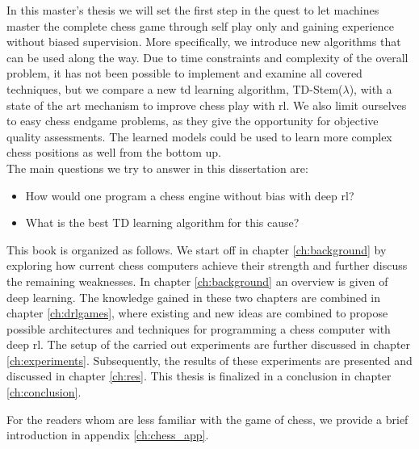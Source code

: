 In this master's thesis we will set the first step in the quest to let machines master the complete chess game through self play only and gaining experience without biased supervision. More specifically, we introduce new algorithms that can be used along the way. Due to time constraints and complexity of the overall problem, it has not been possible to implement and examine all covered techniques, but we compare a new \gls{td} learning algorithm, TD-Stem($\lambda$), with a state of the art mechanism to improve chess play with \gls{rl}. We also limit ourselves to easy chess endgame problems, as they give the opportunity for objective quality assessments. The learned models could be used to learn more complex chess positions as well from the bottom up.\\
The main questions we try to answer in this dissertation are:
\begin{itemize}
\item How would one program a chess engine without bias with deep \gls{rl}?
\item What is the best TD learning algorithm for this cause?
\end{itemize}

This book is organized as follows. We start off in chapter \ref{ch:background} by exploring how current chess computers achieve their strength and further discuss the remaining weaknesses. In chapter \ref{ch:background} an overview is given of deep learning. The knowledge gained in these two chapters are combined in chapter \ref{ch:drlgames}, where existing and new ideas are combined to propose possible architectures and techniques for programming a chess computer with deep \gls{rl}. The setup of the carried out experiments are further discussed in chapter \ref{ch:experiments}. Subsequently, the results of these experiments are presented and discussed in chapter \ref{ch:res}. This thesis is finalized in a conclusion in chapter \ref{ch:conclusion}.

For the readers whom are less familiar with the game of chess, we provide a brief introduction in appendix \ref{ch:chess_app}.






